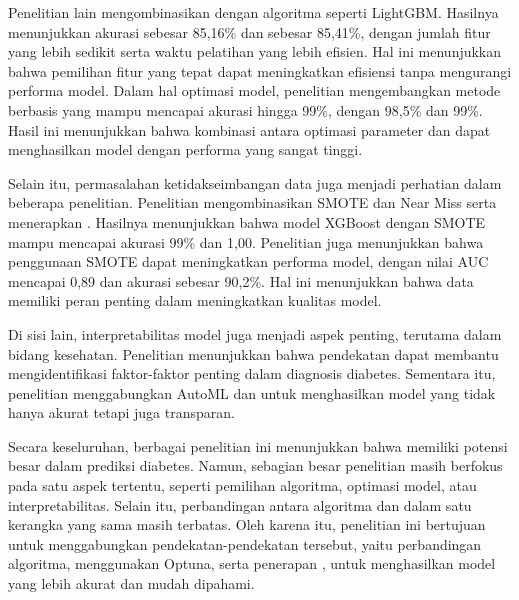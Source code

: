 Penelitian lain \cite{ref27} mengombinasikan  dengan algoritma  seperti LightGBM. Hasilnya menunjukkan akurasi sebesar 85,16\% dan  sebesar 85,41\%, dengan jumlah fitur yang lebih sedikit serta waktu pelatihan yang lebih efisien. Hal ini menunjukkan bahwa pemilihan fitur yang tepat dapat meningkatkan efisiensi tanpa mengurangi performa model. Dalam hal optimasi model, penelitian \cite{ref28} mengembangkan metode berbasis  yang mampu mencapai akurasi hingga 99\%, dengan  98,5\% dan  99\%. Hasil ini menunjukkan bahwa kombinasi antara optimasi parameter dan  dapat menghasilkan model dengan performa yang sangat tinggi.

Selain itu, permasalahan ketidakseimbangan data juga menjadi perhatian dalam beberapa penelitian. Penelitian \cite{ref29} mengombinasikan SMOTE dan Near Miss serta menerapkan . Hasilnya menunjukkan bahwa model XGBoost dengan SMOTE mampu mencapai akurasi 99\% dan  1,00. Penelitian \cite{ref16} juga menunjukkan bahwa penggunaan SMOTE dapat meningkatkan performa model, dengan nilai AUC mencapai 0,89 dan akurasi sebesar 90,2\%. Hal ini menunjukkan bahwa  data memiliki peran penting dalam meningkatkan kualitas model.

Di sisi lain, interpretabilitas model juga menjadi aspek penting, terutama dalam bidang kesehatan. Penelitian \cite{ref30} menunjukkan bahwa pendekatan  dapat membantu mengidentifikasi faktor-faktor penting dalam diagnosis diabetes. Sementara itu, penelitian \cite{ref15} menggabungkan AutoML dan  untuk menghasilkan model yang tidak hanya akurat tetapi juga transparan.

Secara keseluruhan, berbagai penelitian ini menunjukkan bahwa  memiliki potensi besar dalam prediksi diabetes. Namun, sebagian besar penelitian masih berfokus pada satu aspek tertentu, seperti pemilihan algoritma, optimasi model, atau interpretabilitas. Selain itu, perbandingan antara algoritma  dan  dalam satu kerangka yang sama masih terbatas. Oleh karena itu, penelitian ini bertujuan untuk menggabungkan pendekatan-pendekatan tersebut, yaitu perbandingan algoritma,  menggunakan Optuna, serta penerapan , untuk menghasilkan model yang lebih akurat dan mudah dipahami.

